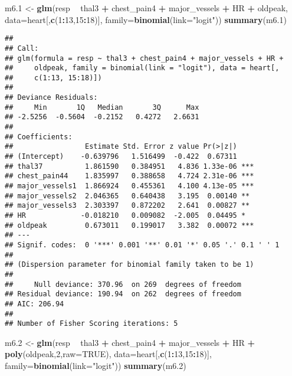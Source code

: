 \documentclass[]{article}
\newenvironment{Shaded}{\begin{snugshade}}{\end{snugshade}}
\newcommand{\KeywordTok}[1]{\textcolor[rgb]{0.13,0.29,0.53}{\textbf{#1}}}
\newcommand{\DataTypeTok}[1]{\textcolor[rgb]{0.13,0.29,0.53}{#1}}
\newcommand{\DecValTok}[1]{\textcolor[rgb]{0.00,0.00,0.81}{#1}}
\newcommand{\StringTok}[1]{\textcolor[rgb]{0.31,0.60,0.02}{#1}}
\newcommand{\OtherTok}[1]{\textcolor[rgb]{0.56,0.35,0.01}{#1}}
\newcommand{\OperatorTok}[1]{\textcolor[rgb]{0.81,0.36,0.00}{\textbf{#1}}}
\newcommand{\NormalTok}[1]{#1}
\begin{document}
\begin{Shaded}
\begin{Highlighting}[]
\NormalTok{m6.}\DecValTok{1}\NormalTok{ <-}\StringTok{ }\KeywordTok{glm}\NormalTok{(resp }\OperatorTok{~}\StringTok{ }\NormalTok{thal3 }\OperatorTok{+}\StringTok{ }\NormalTok{chest_pain4 }\OperatorTok{+}\StringTok{ }\NormalTok{major_vessels }\OperatorTok{+}\StringTok{ }\NormalTok{HR }\OperatorTok{+}\StringTok{ }\NormalTok{oldpeak, }\DataTypeTok{data=}\NormalTok{heart[,}\KeywordTok{c}\NormalTok{(}\DecValTok{1}\OperatorTok{:}\DecValTok{13}\NormalTok{,}\DecValTok{15}\OperatorTok{:}\DecValTok{18}\NormalTok{)], }\DataTypeTok{family=}\KeywordTok{binomial}\NormalTok{(}\DataTypeTok{link=}\StringTok{"logit"}\NormalTok{)) }
\KeywordTok{summary}\NormalTok{(m6.}\DecValTok{1}\NormalTok{)}
\end{Highlighting}
\end{Shaded}

\begin{verbatim}
## 
## Call:
## glm(formula = resp ~ thal3 + chest_pain4 + major_vessels + HR + 
##     oldpeak, family = binomial(link = "logit"), data = heart[, 
##     c(1:13, 15:18)])
## 
## Deviance Residuals: 
##     Min       1Q   Median       3Q      Max  
## -2.5256  -0.5604  -0.2152   0.4272   2.6631  
## 
## Coefficients:
##                 Estimate Std. Error z value Pr(>|z|)    
## (Intercept)    -0.639796   1.516499  -0.422  0.67311    
## thal37          1.861590   0.384951   4.836 1.33e-06 ***
## chest_pain44    1.835997   0.388658   4.724 2.31e-06 ***
## major_vessels1  1.866924   0.455361   4.100 4.13e-05 ***
## major_vessels2  2.046365   0.640438   3.195  0.00140 ** 
## major_vessels3  2.303397   0.872202   2.641  0.00827 ** 
## HR             -0.018210   0.009082  -2.005  0.04495 *  
## oldpeak         0.673011   0.199017   3.382  0.00072 ***
## ---
## Signif. codes:  0 '***' 0.001 '**' 0.01 '*' 0.05 '.' 0.1 ' ' 1
## 
## (Dispersion parameter for binomial family taken to be 1)
## 
##     Null deviance: 370.96  on 269  degrees of freedom
## Residual deviance: 190.94  on 262  degrees of freedom
## AIC: 206.94
## 
## Number of Fisher Scoring iterations: 5
\end{verbatim}

\begin{Shaded}
\begin{Highlighting}[]
\NormalTok{m6.}\DecValTok{2}\NormalTok{ <-}\StringTok{ }\KeywordTok{glm}\NormalTok{(resp }\OperatorTok{~}\StringTok{ }\NormalTok{thal3 }\OperatorTok{+}\StringTok{ }\NormalTok{chest_pain4 }\OperatorTok{+}\StringTok{ }\NormalTok{major_vessels }\OperatorTok{+}\StringTok{ }\NormalTok{HR }\OperatorTok{+}\StringTok{ }\KeywordTok{poly}\NormalTok{(oldpeak,}\DecValTok{2}\NormalTok{,}\DataTypeTok{raw=}\OtherTok{TRUE}\NormalTok{), }\DataTypeTok{data=}\NormalTok{heart[,}\KeywordTok{c}\NormalTok{(}\DecValTok{1}\OperatorTok{:}\DecValTok{13}\NormalTok{,}\DecValTok{15}\OperatorTok{:}\DecValTok{18}\NormalTok{)], }\DataTypeTok{family=}\KeywordTok{binomial}\NormalTok{(}\DataTypeTok{link=}\StringTok{"logit"}\NormalTok{)) }
\KeywordTok{summary}\NormalTok{(m6.}\DecValTok{2}\NormalTok{)}
\end{Highlighting}
\end{Shaded}
\end{document}
